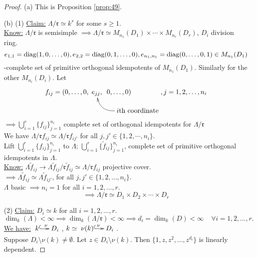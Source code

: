 \begin{proof}
(a) This is Proposition \ref{prop:49}. 

(b) (1) \underline{Claim:} $\Lambda / \mathfrak{r} \simeq k^s$ for some $s \geq 1$.\\
\underline{Know:} $\Lambda / \mathfrak{r}$ is semisimple $\implies
\Lambda / \mathfrak{r} \simeq M_{n_1}(D_1) \times \cdots \times
M_{n_r}(D_r)$, $D_i$ division ring. 
\[e_{1,1} = \operatorname{diag}(1, 0, \ldots, 0), e_{2,2} = \operatorname{diag}(0,1, \ldots, 0), e_{n_1,n_1} = \operatorname{diag}(0, \ldots, 0, 1) \in M_{n_1}(D_1)\]
-complete set of primitive orthogonal idempotents of $M_{n_1}(D_1)$. Similarly for the other $M_{n_i}(D_i)$. Let
\[f_{ij} = (0, \ldots, 0, \xymatrix@C-3pc@R-1pc{e_{jj}, & 0, \ldots, 0)\\
&  *+[r]{i\text{th coordinate}} \ar@/^1pc/[ul] }, j = 1, 2, \ldots , n_i\]
$\implies \bigcup\limits_{i=1}^r \{ f_{ij} \}_{j=1}^{n_i}$ complete set of orthogonal idempotents for $\Lambda / \mathfrak{r}$\\
We have $\Lambda / \mathfrak{r} f_{ij} \simeq \Lambda / \mathfrak{r}
f_{ij'}$ for all $j, j' \in \{ 1, 2, \cdots, n_i \}$.\\
Lift $\bigcup\limits_{i=1}^r \{ f_{ij} \}_{j=1}^{n_i}$ to $\Lambda$;
$\bigcup\limits_{i=1}^r \{ \tilde{f}_{ij} \}_{j=1}^{n_i}$, complete
set of primitive orthogonal idempotents in $\Lambda$.\\ 
\underline{Know:} $\Lambda \tilde{f}_{ij} \to \Lambda \tilde{f}_{ij} /
\mathfrak{r} \tilde{f}_{ij} \simeq \Lambda  / \mathfrak{r} f_{ij}$
projective cover.\\ 
$\implies \Lambda \tilde{f}_{ij}  \simeq \Lambda \tilde{f}_{ij'} $,
for all $j, j' \in \{ 1, 2, \ldots, n_i \}$.\\ 
$\Lambda$ basic $\implies n_i = 1$ for all $i = 1, 2, \ldots, r$.\\
\[\implies \Lambda / \mathfrak{r} \simeq D_1 \times D_2 \times \cdots \times D_r \]

(2) \underline{Claim:} $D_i \simeq k$ for all $i = 1, 2, \ldots, r$.
\[ \dim_k(\Lambda) < \infty \implies \dim_k(\Lambda / \mathfrak{r}) <
  \infty \implies d_i = \dim_k(D) < \infty \;\;\;\; \forall i = 1, 2,
  \ldots, r.\] 
\underline{We have:} $\xymatrix@C-1pc{k \ar@{^{(}->}[r]^\nu & D_i}$,
$k \simeq \xymatrix@C-1pc{\nu(k) \ar@{^{(}->}[r]^\nu & D_i}$.\\ 
Suppose $D_i \setminus \nu(k) \neq \emptyset$. Let $z \in D_i
\setminus \nu(k)$. Then $\{ 1, z, z^2, \ldots, z^{d_i} \}$ is linearly
dependent. 



\end{proof}
